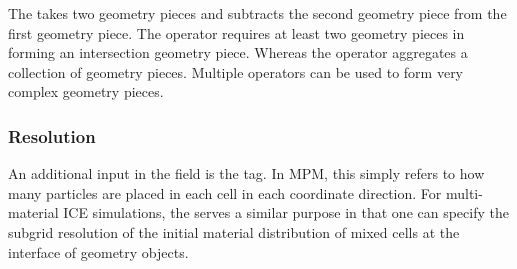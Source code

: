 The  takes two geometry pieces and subtracts
the second geometry piece from the first geometry piece.  The  operator requires at least two geometry
pieces in forming an intersection geometry piece.  Whereas the  operator aggregates a collection of geometry pieces.
Multiple operators can be used to form very complex geometry pieces.

\subsubsection{Resolution}
An additional input in the  field is the
 tag.  In MPM, this simply refers to how many particles
are placed in each cell in each coordinate direction.  For multi-material ICE
simulations, the  serves a similar purpose in that one
can specify the subgrid resolution of the initial material distribution
of mixed cells at the interface of geometry objects.

